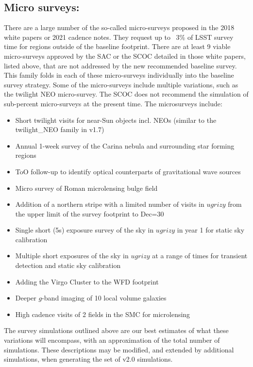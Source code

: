 \subsection{Micro surveys: }
There are a large number of the so-called micro-surveys proposed in the 2018 white papers or 2021 cadence notes. They request up to ~3\% of LSST survey time for regions outside of the baseline footprint. There are at least 9 viable micro-surveys approved by the SAC or the SCOC detailed in those white papers, listed above, that are not addressed by the new recommended baseline survey. This family folds in each of these micro-surveys individually into the baseline survey strategy.  Some of the micro-surveys include multiple variations, such as the twilight NEO micro-survey. The SCOC does not recommend the simulation of sub-percent micro-surveys at the present time. The microsurveys include:
\begin{itemize}
\item Short twilight visits for near-Sun objects incl. NEOs (similar to the twilight\_NEO family in v1.7)
\item Annual 1-week survey of the Carina nebula and surrounding star forming regions
\item ToO follow-up to identify optical counterparts of gravitational wave sources
\item Micro survey of Roman microlensing bulge field
\item Addition of a northern stripe with a limited number of visits in $ugrizy$ from the upper limit of the survey footprint to Dec=30
\item Single short (5s) exposure survey of the sky in $ugrizy$ in year 1 for static sky calibration %
\item Multiple short exposures of the sky in $ugrizy$ at a range of times for transient detection and static sky calibration %
\item Adding the Virgo Cluster to the WFD footprint
\item Deeper $g$-band imaging of 10 local volume galaxies
\item High cadence visits of 2 fields in the SMC for microlensing
\end{itemize}

The survey simulations outlined above are our best estimates of what these variations will encompass, with an approximation of the total number of simulations. These descriptions may be modified, and extended by additional simulations, when generating the set of v2.0 simulations. 
 
